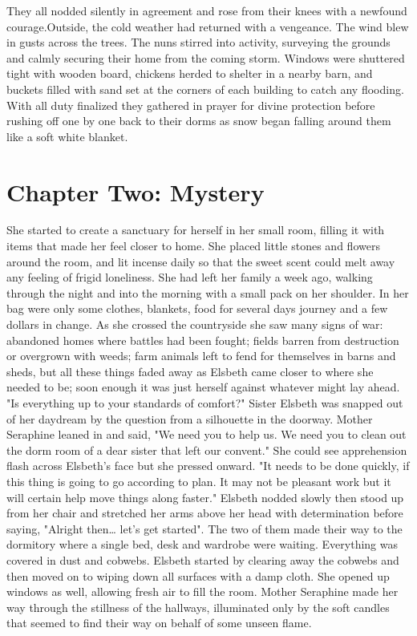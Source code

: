 \documentclass[11pt]{article}
\begin{document}
They all nodded silently in agreement and rose from their knees with a newfound courage.Outside, the cold weather had returned with a vengeance. The wind blew in gusts across the trees. The nuns stirred into activity, surveying the grounds and calmly securing their home from the coming storm. Windows were shuttered tight with wooden board, chickens herded to shelter in a nearby barn, and buckets filled with sand set at the corners of each building to catch any flooding. With all duty finalized they gathered in prayer for divine protection before rushing off one by one back to their dorms as snow began falling around them like a soft white blanket.
\section{Chapter Two: Mystery}
\label{sec:orgc37dffa}
She started to create a sanctuary for herself in her small room, filling it with items that made her feel closer to home. She placed little stones and flowers around the room, and lit incense daily so that the sweet scent could melt away any feeling of frigid loneliness. She had left her family a week ago, walking through the night and into the morning with a small pack on her shoulder. In her bag were only some clothes, blankets, food for several days journey and a few dollars in change. As she crossed the countryside she saw many signs of war: abandoned homes where battles had been fought; fields barren from destruction or overgrown with weeds; farm animals left to fend for themselves in barns and sheds, but all these things faded away as Elsbeth came closer to where she needed to be; soon enough it was just herself against whatever might lay ahead.
"Is everything up to your standards of comfort?" Sister Elsbeth was snapped out of her daydream by the question from a silhouette in the doorway.
Mother Seraphine leaned in and said, "We need you to help us. We need you to clean out the dorm room of a dear sister that left our convent." She could see apprehension flash across Elsbeth's face but she pressed onward. "It needs to be done quickly, if this thing is going to go according to plan. It may not be pleasant work but it will certain help move things along faster."
Elsbeth nodded slowly then stood up from her chair and stretched her arms above her head with determination before saying, "Alright then\ldots{} let's get started". The two of them made their way to the dormitory where a single bed, desk and wardrobe were waiting. Everything was covered in dust and cobwebs. Elsbeth started by clearing away the cobwebs and then moved on to wiping down all surfaces with a damp cloth. She opened up windows as well, allowing fresh air to fill the room. Mother Seraphine made her way through the stillness of the hallways, illuminated only by the soft candles that seemed to find their way on behalf of some unseen flame.
\end{document}
